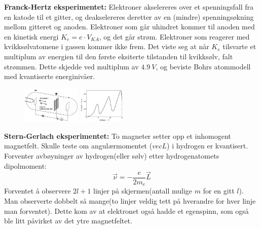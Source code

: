 \documentclass[10p,a4paper]{article}
\begin{document}
\textbf{Franck-Hertz eksperimentet:} Elektroner akselereres over et spenningsfall fra en katode til et gitter, og deakselereres deretter av en (mindre) spenningsøkning mellom gitteret og anoden. Elektroner som går uhindret kommer til anoden med en kinetisk energi $K_e = e\cdot V_{KA}$, og det går strøm. Elektroner som reagerer med kvikksølvatomene i gassen kommer ikke frem. Det viste seg at når $K_e$ tilsvarte et multiplum av energien til den første eksiterte tilstanden til kvikksølv, falt strømmen. Dette skjedde ved multiplum av $\SI{4.9}{V}$, og beviste Bohrs atommodell med kvantiserte energinivåer.
\begin{figure}[H]
\includegraphics[width=0.25\textwidth]{FranckHertz.png}
\includegraphics[width=0.2\textwidth]{FranckHertz2.png}
\end{figure}

\textbf{Stern-Gerlach eksperimentet:} To magneter setter opp et inhomogent magnetfelt. Skulle teste om angulærmomentet ($vec{L}$) i hydrogen er kvantisert. Forventer avbøyninger av hydrogen(eller sølv) etter hydrogenatomets dipolmoment:
\[ \vec{\nu} = -\frac{e}{2m_e}\vec{L} \]
Forventet å observere $2l+1$ linjer på skjermen(antall mulige $m$ for en gitt $l$). Man observerte dobbelt så mange(to linjer veldig tett på hverandre for hver linje man forventet). Dette kom av at elektronet også hadde et egenspinn, som også ble litt påvirket av det ytre magnetfeltet.
\end{document}
